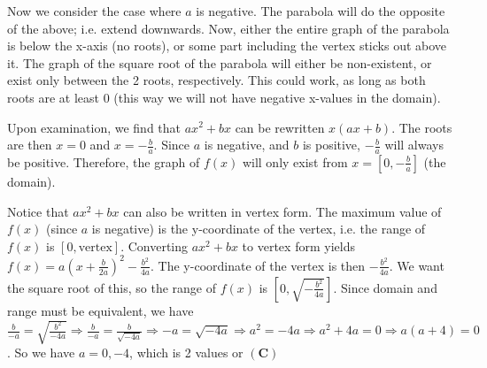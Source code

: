 \begin{enumerate}
 Now we consider the case where $a$ is negative. The parabola will do the opposite of the above; i.e. extend downwards. Now, either the entire graph of the parabola is below the x-axis (no roots), or some part including the vertex sticks out above it. The graph of the square root of the parabola will either be non-existent, or exist only between the 2 roots, respectively. This could work, as long as both roots are at least 0 (this way we will not have negative x-values in the domain). 

 Upon examination, we find that $ax^2+bx$ can be rewritten $x(ax+b)$. The roots are then $x=0$ and $x=-\frac{b}{a}$. Since $a$ is negative, and $b$ is positive, $-\frac{b}{a}$ will always be positive. Therefore, the graph of $f(x)$ will only exist from $x=\left[0, -\frac{b}{a}\right]$ (the domain).

 Notice that $ax^2+bx$ can also be written in vertex form. The maximum value of $f(x)$ (since $a$ is negative) is the y-coordinate of the vertex, i.e. the range of $f(x)$ is $[0, \text{vertex}]$. Converting $ax^2+bx$ to vertex form yields $f(x) = a\left(x + \frac{b}{2a}\right)^2 - \frac{b^2}{4a}$. The y-coordinate of the vertex is then $-\frac{b^2}{4a}$. We want the square root of this, so the range of $f(x)$ is $\left[0, \sqrt{-\frac{b^2}{4a}}\right]$. Since domain and range must be equivalent, we have $\frac{b}{-a} = \sqrt{\frac{b^2}{-4a}} \Rightarrow \frac{b}{-a} = \frac{b}{\sqrt{-4a}} \Rightarrow -a = \sqrt{-4a} \Rightarrow a^2 = -4a \Rightarrow a^2 + 4a = 0 \Rightarrow a(a+4) = 0$. So we have $a= 0, -4$, which is 2 values or $\boxed{\mathbf{(C)}}$



\end{enumerate}